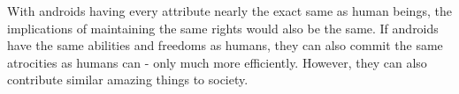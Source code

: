 With androids having every attribute nearly the exact same as human beings, the implications of maintaining the same rights would also be the same. If androids have the same abilities and freedoms as humans, they can also commit the same atrocities as humans can - only much more efficiently. However, they can also contribute similar amazing things to society. 